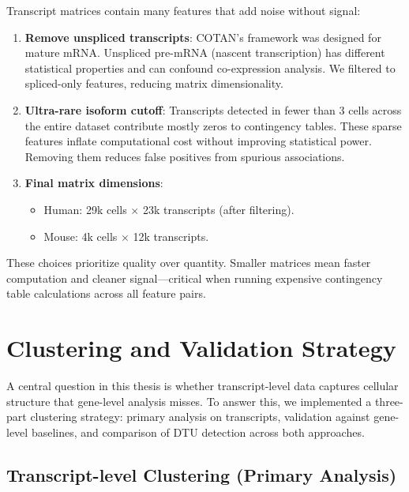 Transcript matrices contain many features that add noise without signal:

\begin{enumerate}
    \item \textbf{Remove unspliced transcripts}: COTAN's framework was designed for mature mRNA. Unspliced pre-mRNA (nascent transcription) has different statistical properties and can confound co-expression analysis. We filtered to spliced-only features, reducing matrix dimensionality.
    \item \textbf{Ultra-rare isoform cutoff}: Transcripts detected in fewer than 3 cells across the entire dataset contribute mostly zeros to contingency tables. These sparse features inflate computational cost without improving statistical power. Removing them reduces false positives from spurious associations.
    \item \textbf{Final matrix dimensions}:
    \begin{itemize}
        \item Human: 29k cells $\times$ 23k transcripts (after filtering).
        \item Mouse: 4k cells $\times$ 12k transcripts.
    \end{itemize}
\end{enumerate}

These choices prioritize quality over quantity. Smaller matrices mean faster computation and cleaner signal---critical when running expensive contingency table calculations across all feature pairs.

\section{Clustering and Validation Strategy}

A central question in this thesis is whether transcript-level data captures cellular structure that gene-level analysis misses. To answer this, we implemented a three-part clustering strategy: primary analysis on transcripts, validation against gene-level baselines, and comparison of DTU detection across both approaches.

\subsection*{Transcript-level Clustering (Primary Analysis)}

